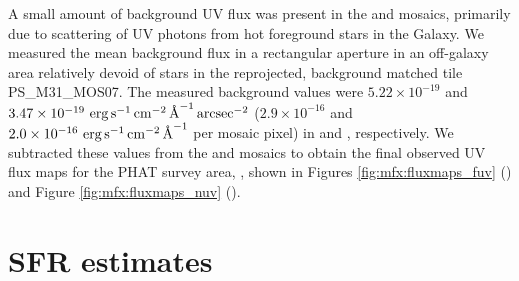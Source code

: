 \documentclass[iop, tighten]{emulateapj}
\begin{document}
A small amount of background UV flux was present in the \fuv{} and \nuv{}
mosaics, primarily due to scattering of UV photons from hot foreground stars in
the Galaxy. We measured the mean background flux in a rectangular aperture in
an off-galaxy area relatively devoid of stars in the reprojected, background
matched tile PS\_M31\_MOS07. The measured background values were $5.22 \times
10^{-19}$ and $3.47 \times 10^{-19}\, \,\mathrm{erg}\,\mathrm{s}^{-1}\,\mathrm{cm}^{-2}\,\textrm{\AA}^{-1}\,\mathrm{arcsec}^{-2}$ ($2.9 \times
10^{-16}$ and $2.0 \times 10^{-16}\, \,\mathrm{erg}\,\mathrm{s}^{-1}\,\mathrm{cm}^{-2}\,\textrm{\AA}^{-1}$ per mosaic pixel) in \fuv{} and
\nuv{}, respectively. We subtracted these values from the \fuv{} and \nuv{}
mosaics to obtain the final observed UV flux maps for the PHAT survey area,
\fxobs{}, shown in Figures \ref{fig:mfx:fluxmaps_fuv} (\fuv{}) and Figure
\ref{fig:mfx:fluxmaps_nuv} (\nuv{}).

%
%





\section{SFR estimates}\label{mfx:sfrestimates}
\end{document}

